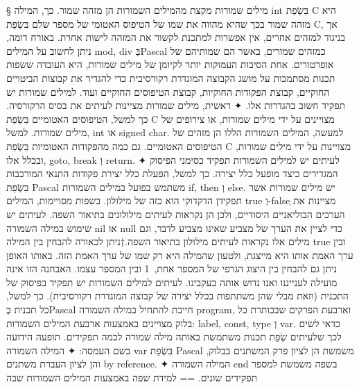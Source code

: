  § מילים שמורות
 מקצת מהמילים השמורות הן מזהה שמור. כך, המילה int בִּשְׂפַת C היא מזהה שמור בכך שהיא מהווה את שמו של הטיפוס האטומי של מספר שלם בִּשְׂפַת C, אך בניגוד למזהים אחרים, אין אפשרות למתכנת לקשור את המזהה לישות אחרת.
 באורח דומה, ניתן לחשוב על המילים mod, div בְּPascal כמזהים שמורים, באשר הם שמותיהם של אופרטורים.
 אחת הסיבות העמוקות יותר לקיומן של מילים שמורות, היא העובדה ששפות תכנות מסתמכות על מושג הקבוצה המוגדרת רקורסיבית כדי להגדיר את קבוצות הביטויים החוקיים, קבוצת הפקודות החוקיות, קבוצת הטיפוסים החוקיים ועוד.
 למילים שמורות יש תפקיד חשוב בהגדרות אלו.
✦ ראשית, מילים שמורות מציינות לעיתים את בסיס הרקורסיה. כך למשל, הטיפוסים האטומיים בִּשְׂפַת C מצויינים על ידי מילים שמורות, או צירופים של מילים שמורות. למשל, int או signed char. למעשה, המילים השמורות הללו הן מזהים של הטיפוסים האטומיים. גם כמה מהפקודות האטומיות בִּשְׂפַת C מצויינות על ידי מילים שמורות, ובכלל אלו, goto, break וְ return.
✦ לעיתים יש למילים השמורות תפקיד כסימני הפיסוק המגדירים כיצד מופעל כלל יצירה. כך למשל, הפעלת כלל יצירת פקודות התנאי המורכבות בִּשְׂפַת Pascal משתמש בפועל במילים השמורות if, then וְ else.
 יש מילים שמורות אשר תפקידן הדקדוקי הוא כזה של מילולון. בשפות מסויימות, המילים true וְ-falseְ מציינות את הערכים הבוליאניים היסודיים, ולכן הן נקראות לעיתים מילולונים בתיאור השפה. לעיתים יש שימוש במילה השמורה nil או null כדי לציין את הערך של מצביע שאינו מצביע לדבר, וגם מילים אלו נקראות לעיתים מילולון בתיאור השפה.†{ניתן לכאורה להבחין בין המילה true ובין ערך האמת אותו היא מייצגת, ולטעון שהמילה היא רק שמו של ערך האמת הזה. באותו האופן ניתן גם להבחין בין היצוג הגרפי של המספר אחת,~1 ובין המספר עצמו. האבחנה הזו אינה מועילה לענייננו ואנו נדוש אותה בעקבינו.}
 לעיתים למילים השמורות יש תפקיד בפיסוק של התכנית (וזאת מבלי שהן משתתפות בכלל יצירה של קבוצה המוגדרת רקורסיבית). כך למשל, כל תכנית בְּPascal חייבת להתחיל במילה השמורה program, וארבעת הפרקים שבכותרת כל בלוק מצויינים באמצעות ארבעת המילים השמורות: label, const, type וְ var.
 כדאי לשים לכך שלעיתים שְׂפַת תכנות משתמשת באותה מילה שמורה לכמה תפקידים. תופעה הידועה בשם העמסה:
✦ המילה השמורה var בִּשְׂפַת Pascal משמשת הן לציון פרק המשתנים בבלוק, והן לציון העברת משתנים by reference.
✦ המילה השמורה end בשפה משמשת למספר תפקידים שונים.
 ==
 למידת שפה באמצעות המילים השמורות שבה

